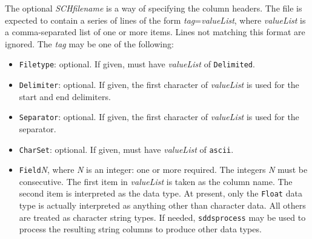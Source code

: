 \begin{itemize}
The optional {\em SCHfilename} is a way of specifying the column headers.  The file is
expected to contain a series of lines of the form {\em tag}={\em valueList}, where {\em
valueList} is a comma-separated list of one or more items.  Lines not matching this format are
ignored.  The {\em tag} may be one of the following:
\begin{itemize}
\item {\tt Filetype}: optional.  If given, must have {\em valueList} of {\tt Delimited}.
\item {\tt Delimiter}: optional.  If given, the first character of {\em valueList} is used for
the start and end delimiters.
\item {\tt Separator}: optional.  If given, the first character of {\em valueList} is used for
the separator.
\item {\tt CharSet}: optional.  If given, must have {\em valueList} of {\tt ascii}.
\item {\tt Field}{\em N}, where {\em N} is an integer: one or more required.  The integers {\em N}
must be consecutive.  The first item in {\em valueList} is taken as the column name.  
The second item is interpreted as the data type.  At present, only the {\tt Float} data type is actually
interpreted as anything other than character data.  All others are
treated as character string types.  If needed, {\tt sddsprocess} may be used to process the
resulting string columns to produce other data types.
\end{itemize}


\end{itemize}

